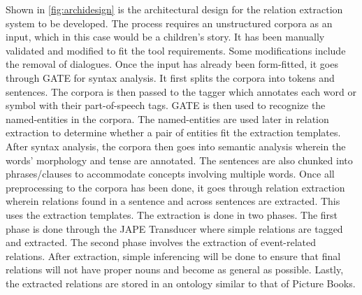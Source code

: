 Shown in \ref{fig:archidesign} is the architectural design for the relation extraction system to be developed. The process requires an unstructured corpora as an input, which in this case would be a children's story. It has been manually validated and modified to fit the tool requirements. Some modifications include the removal of dialogues. Once the input has already been form-fitted, it goes through GATE for syntax analysis. It first splits the corpora into tokens and sentences. The corpora is then passed to the tagger which annotates each word or symbol with their part-of-speech tags. GATE is then used to recognize the named-entities in the corpora. The named-entities are used later in relation extraction to determine whether a pair of entities fit the extraction templates. After syntax analysis, the corpora then goes into semantic analysis wherein the words' morphology and tense are annotated. The sentences are also chunked into phrases/clauses to accommodate concepts involving multiple words. Once all preprocessing to the corpora has been done, it goes through relation extraction wherein relations found in a sentence and across sentences are extracted. This uses the extraction templates. The extraction is done in two phases. The first phase is done through the JAPE Transducer where simple relations are tagged and extracted. The second phase involves the extraction of event-related relations. After extraction, simple inferencing will be done to ensure that final relations will not have proper nouns and become as general as possible. Lastly, the extracted relations are stored in an ontology similar to that of Picture Books. 



